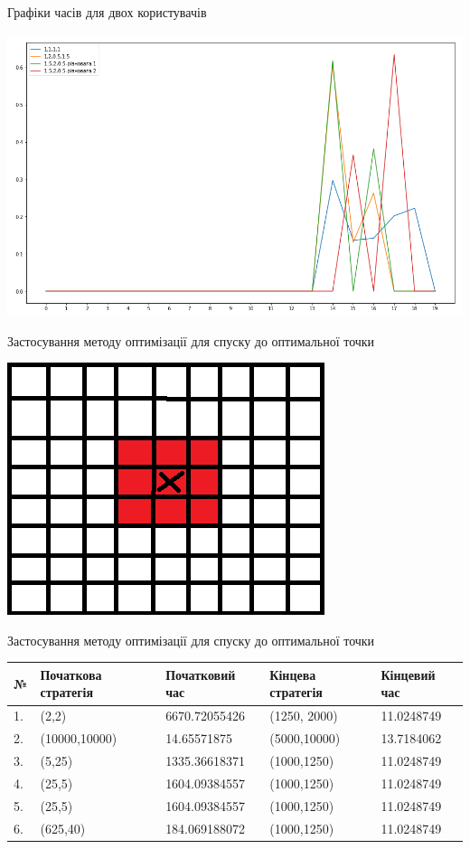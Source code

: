 \begin{frame}{Графіки часів для двох користувачів}
	\manimate
	
	\centering
	\includegraphics[width=0.6\linewidth]{im/nash_strategy_together}
\end{frame}

\begin{frame}{Застосування методу оптимізації для спуску до оптимальної точки}
	\manimate
	
	\centering
	\includegraphics[width=0.6\linewidth]{im/box}

\end{frame}

\begin{frame}{Застосування методу оптимізації для спуску до оптимальної точки}
	\manimate
	
	\centering
	
	\begin{table}[H]
		\tiny
		\begin{tabular}{|l|l|l|l|l|}
			\hline
			№ & Початкова стратегія & Початковий час 	& Кінцева стратегія & Кінцевий час
			\\ \hline
			1.& (2,2)				& 6670.72055426     &  (1250, 2000) 	& 11.0248749
			\\ \hline
			2.& (10000,10000)		& 14.65571875   	&  (5000,10000)		& 13.7184062
			\\ \hline
			3.& (5,25)				& 1335.36618371		&  (1000,1250)		& 11.0248749
			\\ \hline
			4.& (25,5)				& 1604.09384557		&  (1000,1250)		& 11.0248749
			\\ \hline
			5.& (25,5)				& 1604.09384557		&  (1000,1250)		& 11.0248749
			\\ \hline
			6.& (625,40)			& 184.069188072		&  (1000,1250)		& 11.0248749
			\\ \hline
			
		\end{tabular}
	\end{table}

\end{frame}






